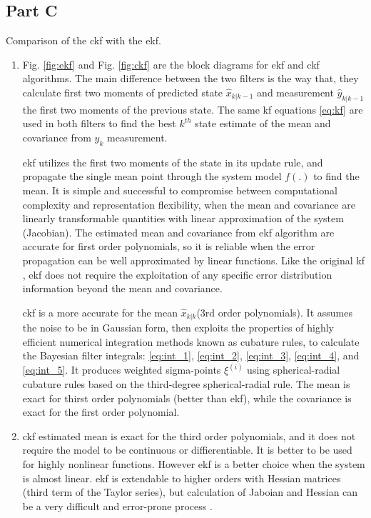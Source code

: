 \documentclass[12pt]{article}
\begin{document}
\subsection*{Part C}
Comparison of the \acrshort{ckf} with the \acrshort{ekf}.
\begin{enumerate}[label=\arabic*)]
    \item 
        Fig. \ref{fig:ekf} and Fig. \ref{fig:ckf} are the block diagrams for \acrshort{ekf} and \acrshort{ckf}  algorithms. The main difference between the two filters is the way that, they calculate first two moments of predicted state $\hat{x}_{k|k-1}$ and measurement $\hat{y}_{k|k-1}$ the first two moments of the previous state. The same \acrshort{kf} equations \eqref{eq:kf} are used in both filters to find the best $k^{th}$ state estimate of the mean and covariance from $y_k$ measurement.
        
        \acrshort{ekf} utilizes the first two moments of the state in its update rule, and propagate the single mean point through the system model $f(.)$ to find the mean. It is simple and successful to compromise between computational complexity and representation flexibility, when the mean and covariance are linearly transformable quantities with linear approximation of the system (Jacobian). The estimated mean and covariance from \acrshort{ekf} algorithm are accurate for first order polynomials, so it is reliable when the error propagation can be well approximated by linear functions. Like the original \acrshort{kf} \cite{kalman1960new}, \acrshort{ekf} does not require the exploitation of any specific error distribution information beyond the mean and covariance. 
        
        \acrshort{ckf} is a more accurate for the mean $\hat{x}_{k|k}$(3rd order polynomials). It assumes the noise to be in Gaussian form, then exploits the properties of highly efficient numerical integration methods known as cubature rules, to calculate the Bayesian filter integrals: \eqref{eq:int_1}, \eqref{eq:int_2}, \eqref{eq:int_3}, \eqref{eq:int_4}, and \eqref{eq:int_5}. It produces weighted sigma-points $\xi^{(i)}$ using spherical-radial cubature rules based on the third-degree spherical-radial rule. The mean is exact for thirst order polynomials (better than \acrshort{ekf}), while the covariance is exact for the first order polynomial. 
        
    \item
    
        \acrshort{ckf} estimated mean is exact for the third order polynomials, and it does not require the model to be continuous or diffierentiable. It is better to be used for highly nonlinear functions. However \acrshort{ekf} is a better choice when the system is almost linear. \acrshort{ekf} is extendable to higher orders with Hessian matrices (third term of the Taylor series), but calculation of Jaboian and Hessian can be a very difficult and error-prone process \cite{julier2004unscented, dulimov1998estimation}. 
        

\end{enumerate}
\end{document}

